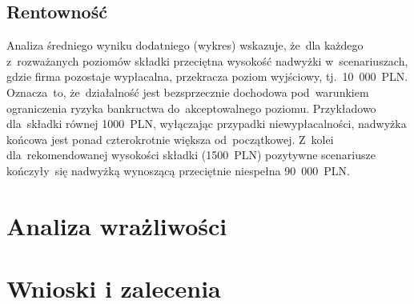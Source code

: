 \documentclass[12pt, a4paper, oneside]{mwart} %
\begin{document}
\subsection{Rentowność}
Analiza średniego wyniku dodatniego (wykres) wskazuje, że~dla każdego z~rozważanych poziomów składki przeciętna wysokość nadwyżki w~scenariuszach, gdzie firma pozostaje wypłacalna, przekracza poziom wyjściowy, tj.~10~000~PLN. Oznacza~to, że~działalność jest bezsprzecznie dochodowa pod~warunkiem ograniczenia ryzyka bankructwa do~akceptowalnego poziomu. Przykładowo dla~składki równej 1000~PLN, wyłączając przypadki niewypłacalności, nadwyżka końcowa jest ponad czterokrotnie większa od~początkowej. Z~kolei dla~rekomendowanej wysokości składki (1500~PLN) pozytywne scenariusze kończyły~się nadwyżką wynoszącą przeciętnie niespełna 90~000~PLN.

\section{Analiza wrażliwości}

\section{Wnioski i zalecenia}
%
\end{document}
